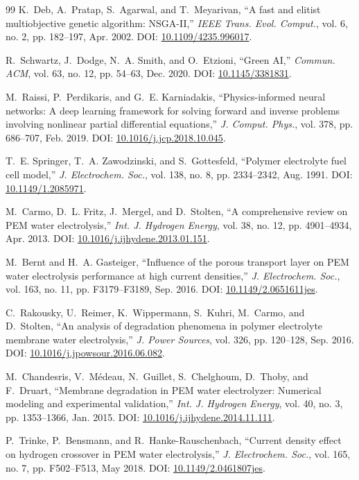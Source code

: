 \documentclass[conference]{IEEEtran}
\begin{document}
\begin{thebibliography}{99}
K.~Deb, A.~Pratap, S.~Agarwal, and T.~Meyarivan, ``A fast and elitist multiobjective genetic algorithm: NSGA-II,'' \emph{IEEE Trans. Evol. Comput.}, vol. 6, no. 2, pp. 182--197, Apr. 2002. DOI: \url{10.1109/4235.996017}.

R.~Schwartz, J.~Dodge, N.~A. Smith, and O.~Etzioni, ``Green AI,'' \emph{Commun. ACM}, vol. 63, no. 12, pp. 54--63, Dec. 2020. DOI: \url{10.1145/3381831}.

M.~Raissi, P.~Perdikaris, and G.~E. Karniadakis, ``Physics-informed neural networks: A deep learning framework for solving forward and inverse problems involving nonlinear partial differential equations,'' \emph{J. Comput. Phys.}, vol. 378, pp. 686--707, Feb. 2019. DOI: \url{10.1016/j.jcp.2018.10.045}.

T.~E. Springer, T.~A. Zawodzinski, and S.~Gottesfeld, ``Polymer electrolyte fuel cell model,'' \emph{J. Electrochem. Soc.}, vol. 138, no. 8, pp. 2334--2342, Aug. 1991. DOI: \url{10.1149/1.2085971}.

M.~Carmo, D.~L. Fritz, J.~Mergel, and D.~Stolten, ``A comprehensive review on PEM water electrolysis,'' \emph{Int. J. Hydrogen Energy}, vol. 38, no. 12, pp. 4901--4934, Apr. 2013. DOI: \url{10.1016/j.ijhydene.2013.01.151}.

M.~Bernt and H.~A. Gasteiger, ``Influence of the porous transport layer on PEM water electrolysis performance at high current densities,'' \emph{J. Electrochem. Soc.}, vol. 163, no. 11, pp. F3179--F3189, Sep. 2016. DOI: \url{10.1149/2.0651611jes}.

C.~Rakousky, U.~Reimer, K.~Wippermann, S.~Kuhri, M.~Carmo, and D.~Stolten, ``An analysis of degradation phenomena in polymer electrolyte membrane water electrolysis,'' \emph{J. Power Sources}, vol. 326, pp. 120--128, Sep. 2016. DOI: \url{10.1016/j.jpowsour.2016.06.082}.

M.~Chandesris, V.~M\'edeau, N.~Guillet, S.~Chelghoum, D.~Thoby, and F.~Druart, ``Membrane degradation in PEM water electrolyzer: Numerical modeling and experimental validation,'' \emph{Int. J. Hydrogen Energy}, vol. 40, no. 3, pp. 1353--1366, Jan. 2015. DOI: \url{10.1016/j.ijhydene.2014.11.111}.

P.~Trinke, P.~Bensmann, and R.~Hanke-Rauschenbach, ``Current density effect on hydrogen crossover in PEM water electrolysis,'' \emph{J. Electrochem. Soc.}, vol. 165, no. 7, pp. F502--F513, May 2018. DOI: \url{10.1149/2.0461807jes}.


\end{thebibliography}
\end{document}
